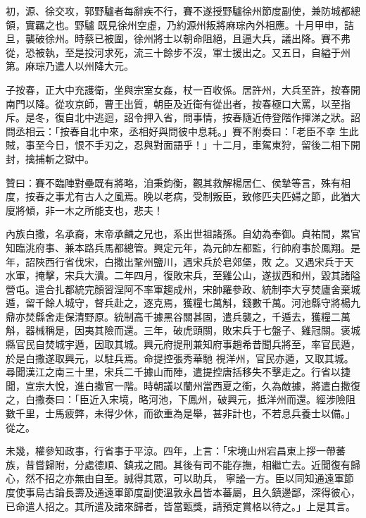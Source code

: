 \begin{pinyinscope}
 初，源、徐交攻，郭野驢者每辭疾不行，賽不遂授野驢徐州節度副使，兼防城都總領，實羈之也。野驢
 既見徐州空虛，乃約源州叛將麻琮內外相應。十月甲申，詰旦，襲破徐州。時蔡已被圍，徐州將士以朝命阻絕，且逼大兵，議出降。賽不弗從，恐被執，至是投河求死，流三十餘步不沒，軍士援出之。又五日，自縊于州第。麻琮乃遣人以州降大元。



 子按春，正大中充護衛，坐與宗室女姦，杖一百收係。居許州，大兵至許，按春開南門以降。從攻京師，曹王出質，朝臣及近衛有從出者，按春極口大罵，以至指斥。是冬，復自北中逃迴，詔令押入省，問事情，按春隨近侍登階作揮涕之狀。詔問丞相云：「按春自北中來，丞相好與問彼中息耗。」賽不附奏曰：「老臣不幸
 生此賊，事至今日，恨不手刃之，忍與對面語乎！」十二月，車駕東狩，留後二相下開封，擒捕斬之獄中。



 贊曰：賽不臨陣對壘既有將略，洎秉鈞衡，觀其救解楊居仁、侯摯等言，殊有相度，按春之事尤有古人之風焉。晚以老病，受制叛臣，致修匹夫匹婦之節，此猶大廈將傾，非一木之所能支也，悲夫！



 內族白撒，名承裔，末帝承麟之兄也，系出世祖諸孫。自幼為奉御。貞祐間，累官知臨洮府事、兼本路兵馬都總管。興定元年，為元帥左都監，行帥府事於鳳翔。是年，詔陜西行省伐宋，白撒出鞏州鹽川，遇宋兵於皂郊堡，敗
 之。又遇宋兵于天水軍，掩擊，宋兵大潰。二年四月，復敗宋兵，至雞公山，遂拔西和州，毀其諸隘營屯。遣合扎都統完顏習涅阿不率軍趨成州，宋帥羅參政、統制李大亨焚廬舍棄城遁，留千餘人城守，督兵赴之，逐克焉，獲糧七萬斛，錢數千萬。河池縣守將楊九鼎亦焚縣舍走保清野原。統制高千據黑谷關甚固，遣兵襲之，千遁去，獲糧二萬斛，器械稱是，因夷其險而還。三年，破虎頭關，敗宋兵于七盤子、雞冠關。褒城縣官民自焚城宇遁，因取其城。興元府提刑兼知府事趙希昔聞兵將至，率官民遁，於是白撒遂取興元，以駐兵焉。命提控張秀華馳
 視洋州，官民亦遁，又取其城。尋聞漢江之南三十里，宋兵二千據山而陣，遣提控唐括移失不擊走之。行省以捷聞，宣宗大悅，進白撒官一階。時朝議以蘭州當西夏之衝，久為敵據，將遣白撒復之，白撒奏曰：「臣近入宋境，略河池，下鳳州，破興元，抵洋州而還。經涉險阻數千里，士馬疲弊，未得少休，而欲重為是舉，甚非計也，不若息兵養士以備。」從之。



 未幾，權參知政事，行省事于平涼。四年，上言：「宋境山州宕昌東上拶一帶蕃族，昔嘗歸附，分處德順、鎮戎之間。其後有司不能存撫，相繼亡去。近聞復有歸心，然不招之亦無由自至。誠得其眾，可以助兵，
 寧謐一方。臣以同知通遠軍節度使事烏古論長壽及通遠軍節度副使溫敦永昌皆本蕃屬，且久鎮邊鄙，深得彼心，已命遣人招之。其所遣及諸來歸者，皆當甄獎，請預定賞格以待之。」上是其言。




\end{pinyinscope}
